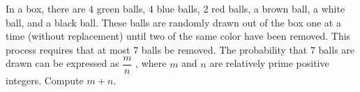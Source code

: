In a box, there are $4$ green balls, $4$ blue balls, $2$ red balls, a brown ball, a white ball, and a black ball. These balls are randomly drawn out of the box one at a time (without replacement) until two of the same color have been removed. This process requires that at most $7$ balls be removed. The probability that $7$ balls are drawn can be expressed as $\dfrac{m}{n}$ , where $m$ and $n$ are relatively prime positive integers. Compute $m + n$.
